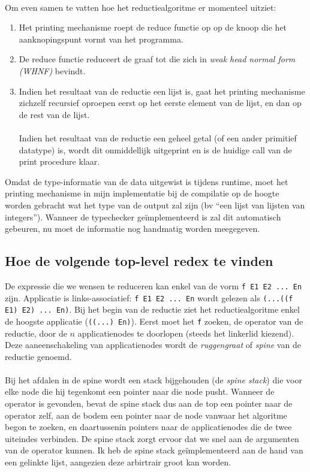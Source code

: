 \documentclass[a4paper,10pt]{article}
\begin{document}
\paragraph{}
Om even samen te vatten hoe het reductiealgoritme er momenteel uitziet:
\begin{enumerate}
\item
  Het printing mechanisme roept de reduce functie op op de knoop die het aanknopingspunt vormt van het programma.
\item
  De reduce functie reduceert de graaf tot die zich in \emph{weak head normal form (WHNF)} bevindt.
\item
  Indien het resultaat van de reductie een lijst is, gaat het printing mechanisme zichzelf recursief oproepen eerst op het eerste element van de lijst, en dan op de rest van de lijst.
  \paragraph{}
  Indien het resultaat van de reductie een geheel getal (of een ander primitief datatype) is, wordt dit onmiddellijk uitgeprint en is de huidige call van de print procedure klaar.
\end{enumerate}
Omdat de type-informatie van de data uitgewist is tijdens runtime, moet het printing mechanisme in mijn implementatie bij de compilatie op de hoogte worden gebracht wat het type van de output zal zijn (bv ``een lijst van lijsten van integers'').
Wanneer de typechecker ge{\"i}mplementeerd is zal dit automatisch gebeuren, nu moet de informatie nog handmatig worden meegegeven.

\subsection{Hoe de volgende top-level redex te vinden}
De expressie die we wensen te reduceren kan enkel van de vorm \texttt{f E1 E2 ... En} zijn.
Applicatie is links-associatief: \texttt{f E1 E2 ... En} wordt gelezen als \texttt{(...((f E1) E2) ... En)}.
Bij het begin van de reductie ziet het reductiealgoritme enkel de hoogste applicatie (\texttt{((...) En)}).
Eerst moet het \texttt{f} zoeken, de operator van de reductie, door de $n$ applicatienodes te doorlopen (steeds het linkerlid kiezend).
Deze aaneenschakeling van applicatienodes wordt de \emph{ruggengraat} of \emph{spine} van de reductie genoemd.
\paragraph{}
Bij het afdalen in de spine wordt een stack bijgehouden (de \emph{spine stack}) die voor elke node die hij tegenkomt een pointer naar die node pusht.
Wanneer de operator is gevonden, bevat de spine stack dus aan de top een pointer naar de operator zelf, aan de bodem een pointer naar de node vanwaar het algoritme begon te zoeken, en daartussenin pointers naar de applicatienodes die de twee uiteindes verbinden.
De spine stack zorgt ervoor dat we snel aan de argumenten van de operator kunnen.
Ik heb de spine stack ge{\"i}mplementeerd aan de hand van een gelinkte lijst, aangezien deze arbirtrair groot kan worden.
\end{document}
